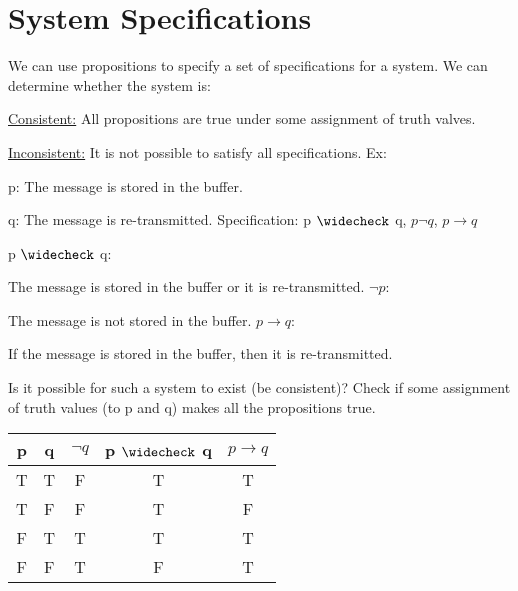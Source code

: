 \documentclass{article}
\begin{document}
\section{System Specifications}
We can use propositions to specify a set of specifications for a system. We can determine whether the system is:


\underline{Consistent:} All propositions are true under some assignment of truth valves.

\underline{Inconsistent:} It is not possible to satisfy all specifications.
\hfill \break
Ex:

p: The message is stored in the buffer.

q: The message is re-transmitted.
\hfill \break
Specification: p $\widecheck$ q, $p\neg q$, $p\rightarrow q$

\hfill \break
p $\widecheck$ q:

The message is stored in the buffer or it is re-transmitted.
\hfill \break
$\neg p$: 

The message is not stored in the buffer.
\hfill \break
$p\rightarrow q$:

If the message is stored in the buffer, then it is re-transmitted.

\hfill \break
Is it possible for such a system to exist (be consistent)? Check if some assignment of truth values (to p and q) makes all the propositions true.
\begin{center}
\begin{tabular}{ |c|c|c|c|c| } 
 \hline
 p & q & $\neg q$ & p $\widecheck$ q & $p\rightarrow q$ \\ 
 \hline
 T & T & F & T & T \\ 
 T & F & F & T & F \\
 F & T & T & T & T \\
 F & F & T & F & T \\
 \hline
\end{tabular}
\end{center}
\end{document}
